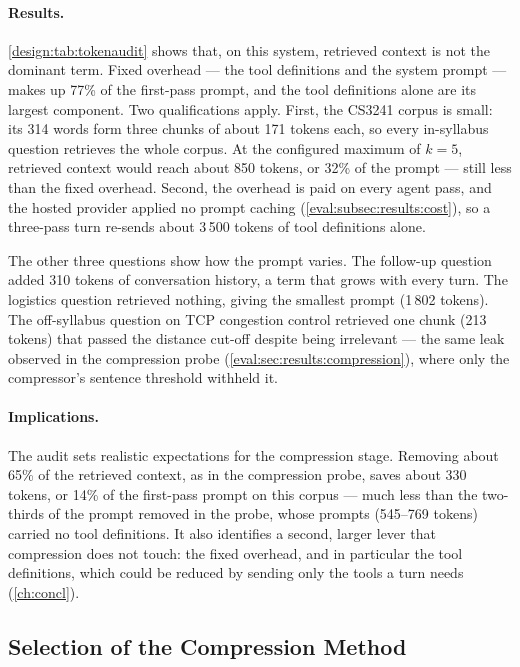 \paragraph{Results.} \autoref{design:tab:tokenaudit} shows that, on this
system, retrieved context is not the dominant term. Fixed overhead --- the
tool definitions and the system prompt --- makes up 77\% of the first-pass
prompt, and the tool definitions alone are its largest component. Two
qualifications apply. First, the CS3241 corpus is small: its 314 words form
three chunks of about 171 tokens each, so every in-syllabus question
retrieves the whole corpus. At the configured maximum of $k = 5$, retrieved
context would reach about 850 tokens, or 32\% of the prompt --- still less
than the fixed overhead. Second, the overhead is paid on every agent pass,
and the hosted provider applied no prompt caching
(\autoref{eval:subsec:results:cost}), so a three-pass turn re-sends about
3\,500 tokens of tool definitions alone.

The other three questions show how the prompt varies. The follow-up question
added 310 tokens of conversation history, a term that grows with every turn.
The logistics question retrieved nothing, giving the smallest prompt
(1\,802 tokens). The off-syllabus question on TCP congestion control
retrieved one chunk (213 tokens) that passed the distance cut-off despite
being irrelevant --- the same leak observed in the compression probe
(\autoref{eval:sec:results:compression}), where only the compressor's
sentence threshold withheld it.

\paragraph{Implications.} The audit sets realistic expectations for the
compression stage. Removing about 65\% of the retrieved context, as in the
compression probe, saves about 330 tokens, or 14\% of the first-pass prompt
on this corpus --- much less than the two-thirds of the prompt removed in
the probe, whose prompts (545--769 tokens) carried no tool definitions. It
also identifies a second, larger lever that compression does not touch: the
fixed overhead, and in particular the tool definitions, which could be
reduced by sending only the tools a turn needs (\autoref{ch:concl}).

\subsection{Selection of the Compression Method}
\label{design:subsec:compression-choice}

